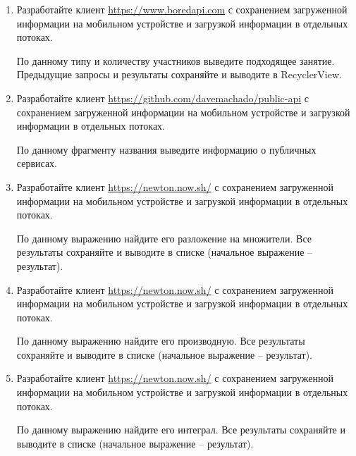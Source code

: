 \begin{enumerate}
	\item Разработайте клиент \url{https://www.boredapi.com} с сохранением загруженной информации на мобильном устройстве и загрузкой
		информации в отдельных потоках. 

		По данному типу и количеству участников выведите подходящее занятие. Предыдущие запросы и результаты сохраняйте и выводите в 
		RecyclerView.

	\item Разработайте клиент \url{https://github.com/davemachado/public-api} с сохранением загруженной информации на мобильном устройстве и загрузкой
		информации в отдельных потоках. 

		По данному фрагменту названия выведите информацию о публичных сервисах.



	\item Разработайте клиент \url{https://newton.now.sh/} с сохранением загруженной информации на мобильном устройстве и загрузкой
		информации в отдельных потоках. 

		По данному выражению найдите его разложение на множители. Все результаты сохраняйте и выводите в списке (начальное выражение -- результат).

	\item Разработайте клиент \url{https://newton.now.sh/} с сохранением загруженной информации на мобильном устройстве и загрузкой
		информации в отдельных потоках. 

		По данному выражению найдите его производную. Все результаты сохраняйте и выводите в списке (начальное выражение -- результат).

	\item Разработайте клиент \url{https://newton.now.sh/} с сохранением загруженной информации на мобильном устройстве и загрузкой
		информации в отдельных потоках. 

		По данному выражению найдите его интеграл. Все результаты сохраняйте и выводите в списке (начальное выражение -- результат).
























\end{enumerate}

